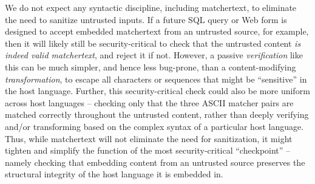We do not expect any syntactic discipline, including matchertext,
to eliminate the need to sanitize untrusted inputs.
If a future SQL query or Web form is designed to accept
embedded matchertext from an untrusted source, for example,
then it will likely still be security-critical to check
that the untrusted content \emph{is indeed valid matchertext},
and reject it if not.
However, a passive \emph{verification} like this
can be much simpler, and hence less bug-prone,
than a content-modifying \emph{transformation},
to escape all characters or sequences that might be ``sensitive''
in the host language.
Further, this security-critical check
could also be more uniform across host languages --
\ie checking only that the three ASCII matcher pairs are matched correctly
throughout the untrusted content,
rather than deeply verifying and/or transforming
based on the complex syntax of a particular host language.
Thus, while matchertext will not eliminate the need for sanitization,
it might tighten and simplify
the function of the most security-critical ``checkpoint'' --
namely checking that embedding content from an untrusted source
preserves the structural integrity
of the host language it is embedded in.

